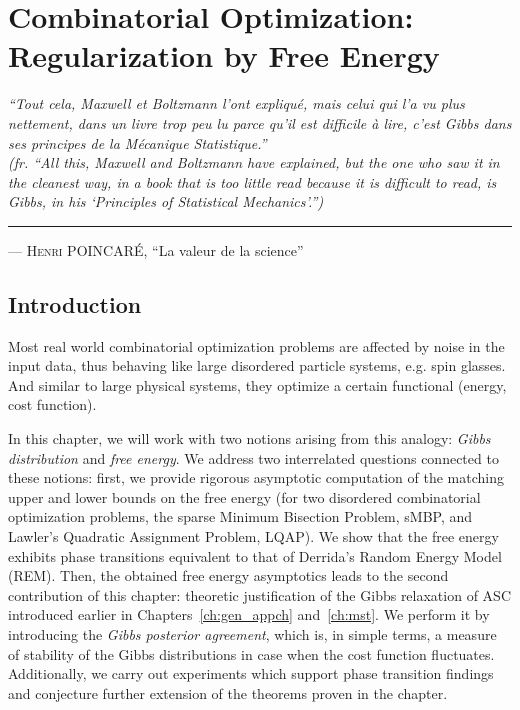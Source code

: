 \chapter[Combinatorial Optimization: Regularization by Free Energy]{%
  Combinatorial Optimization: \\ Regularization by Free Energy}
\label{ch:free_energy}

\hfill
\begin{minipage}[t]{.75\textwidth}
\textit{``Tout cela, Maxwell et Boltzmann l'ont expliqué, mais celui qui l'a vu
plus nettement, dans un livre trop peu lu parce qu'il est difficile à lire,
c'est Gibbs dans ses principes de la Mécanique Statistique.''} \\[.2cm]
\textit{(fr. ``All this, Maxwell and Boltzmann have explained, but the one who saw it
in the cleanest way, in a book that is too little read because it is difficult
to read, is Gibbs, in his `Principles of Statistical Mechanics'.'')} \\
\hrule
\vspace{.2cm}
\hfill
\textsc{--- Henri POINCARÉ}, ``La valeur de la science''
\end{minipage}

\section{Introduction}

Most real world combinatorial optimization problems are affected by noise in the
input data, thus behaving like large disordered particle systems, e.g. spin
glasses. And similar to large physical systems, they optimize a certain functional
(energy, cost function). 

In this chapter, we will work with two notions arising from this analogy:
\textit{Gibbs distribution} and \textit{free energy}. We address two
interrelated questions connected to these notions: first, we provide rigorous
asymptotic computation of the matching upper and lower bounds on the free energy
(for two disordered combinatorial optimization problems, the sparse Minimum
Bisection Problem, sMBP, and Lawler's Quadratic Assignment Problem, LQAP). We
show that the free energy exhibits phase transitions equivalent to that of 
Derrida's Random Energy Model (REM). Then, the obtained free energy asymptotics
leads to the second contribution of this chapter: theoretic justification of the
Gibbs relaxation of ASC introduced earlier in Chapters~\ref{ch:gen_appch}
and~\ref{ch:mst}. We perform it by introducing the \textit{Gibbs posterior
agreement}, which is, in simple terms, a measure of stability of the Gibbs
distributions in case when the cost function fluctuates. Additionally, we carry
out experiments which support phase transition findings and conjecture further
extension of the theorems proven in the chapter.


